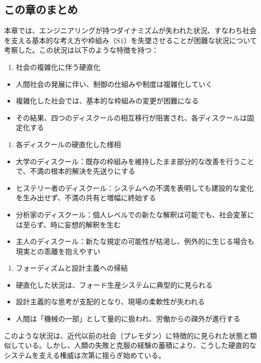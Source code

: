 \subsection{この章のまとめ}\label{ux3053ux306eux7ae0ux306eux307eux3068ux3081}

本章では、エンジニアリングが持つダイナミズムが失われた状況、すなわち社会を支える基本的な考え方や枠組み（\(\textrm{S}1\)）を失墜させることが困難な状況について考察した。この状況は以下のような特徴を持つ：

\begin{enumerate}
\def\labelenumi{\arabic{enumi}.}
\tightlist
\item
  社会の複雑化に伴う硬直化
\end{enumerate}

\begin{itemize}
\tightlist
\item
  人間社会の発展に伴い、制御の仕組みや制度は複雑化していく
\item
  複雑化した社会では、基本的な枠組みの変更が困難になる
\item
  その結果、四つのディスクールの相互移行が阻害され、各ディスクールは固定化する
\end{itemize}

\begin{enumerate}
\def\labelenumi{\arabic{enumi}.}
\setcounter{enumi}{1}
\tightlist
\item
  各ディスクールの硬直化した様相
\end{enumerate}

\begin{itemize}
\tightlist
\item
  \mbox{大学のディスクール}：既存の枠組みを維持したまま部分的な改善を行うことで、不満の根本的解決を先送りにする
\item
  \mbox{ヒステリー者のディスクール}：システムへの不満を表明しても建設的な変化を生み出せず、不満の共有と増幅に終始する
\item
  \mbox{分析家のディスクール}：個人レベルでの新たな解釈は可能でも、社会変革には至らず、時に妄想的解釈を生む
\item
  \mbox{主人のディスクール}：新たな規定の可能性が枯渇し、例外的に生じる場合も現実との乖離を抱えやすい
\end{itemize}

\begin{enumerate}
\def\labelenumi{\arabic{enumi}.}
\setcounter{enumi}{2}
\tightlist
\item
  フォーディズムと設計主義への帰結
\end{enumerate}

\begin{itemize}
\tightlist
\item
  硬直化した状況は、フォード生産システムに典型的に見られる
\item
  設計主義的な思考が支配的となり、現場の柔軟性が失われる
\item
  人間は「機械の一部」として量的に扱われ、労働からの疎外が進行する
\end{itemize}

このような状況は、近代以前の社会（プレモダン）に特徴的に見られた状態と類似している。しかし、人類の失敗と克服の経験の蓄積により、こうした硬直的なシステムを支える権威は次第に揺らぎ始めている。
